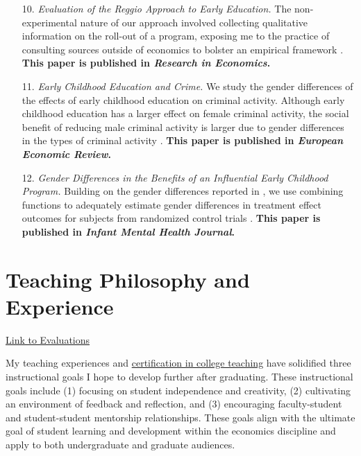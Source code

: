 \begin{enumerate}

    \item[10.] \textit{Evaluation of the Reggio Approach to Early Education.} The non-experimental nature of our approach involved collecting qualitative information on the roll-out of a program, exposing me to the practice of consulting sources outside of economics to bolster an empirical framework \citep{biroli_evaluation_2018}. \textbf{This paper is published in \textit{Research in Economics}.}

    \item[11.] \textit{Early Childhood Education and Crime.} We study the gender differences of the effects of early childhood education on criminal activity. Although early childhood education has a larger effect on female criminal activity, the social benefit of reducing male criminal activity is larger due to gender differences in the types of criminal activity \citep{garcia_gender_2018}. \textbf{This paper is published in \textit{European Economic Review}.}

    \item[12.] \textit{Gender Differences in the Benefits of an Influential Early Childhood Program.} Building on the gender differences reported in \citet{garcia_gender_2018}, we use combining functions to adequately estimate gender differences in treatment effect outcomes for subjects from randomized control trials \citep{garcia_early_2019}. \textbf{This paper is published in \textit{Infant Mental Health Journal}.}

\end{enumerate}

\section{Teaching Philosophy and Experience}

 \href{https://aziff.github.io/teaching/}{Link to Evaluations}

My teaching experiences and \href{https://gradschool.duke.edu/professional-development/programs/certificate-college-teaching/}{certification in college teaching} have solidified three instructional goals I hope to develop further after graduating. These instructional goals include (1) focusing on student independence and creativity, (2) cultivating an environment of feedback and reflection, and (3) encouraging faculty-student and student-student mentorship relationships. These goals align with the ultimate goal of student learning and development within the economics discipline and apply to both undergraduate and graduate audiences. 

